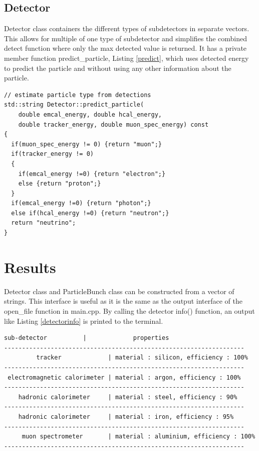 \documentclass[11pt]{article} %
\begin{document}
\subsection{Detector}
Detector class containers the different types of subdetectors in separate vectors. This allows for multiple of one type of subdetector and simplifies the combined detect function where only the max detected value is returned. It has a private member function predict\_particle, Listing \ref{predict}, which uses detected energy to predict the particle and without using any other information about the particle. 

\begin{lstlisting}[firstnumber=117, caption={Code snippet from Detector.cpp showing the logic used to predict particle that passed through the detector.}, label=predict]
// estimate particle type from detections
std::string Detector::predict_particle(
	double emcal_energy, double hcal_energy,
    double tracker_energy, double muon_spec_energy) const
{
  if(muon_spec_energy != 0) {return "muon";}
  if(tracker_energy != 0)
  {
    if(emcal_energy !=0) {return "electron";}
    else {return "proton";}
  }
  if(emcal_energy !=0) {return "photon";}
  else if(hcal_energy !=0) {return "neutron";}
  return "neutrino";
}
\end{lstlisting} 
\section{Results}
Detector class and ParticleBunch class can be constructed from a vector of strings. This interface is useful as it is the same as the output interface of the open\_file function in main.cpp.
By calling the detector info() function, an output like Listing \ref{detectorinfo} is printed to the terminal. 

\begin{lstlisting}[caption={Expected output for Detector.info() for a detector composing of 1 track, 1 electromagnetic calorimeter, 2 hadronic calorimeter and a muon spectrometer.}, label=detectorinfo]
       sub-detector          |             properties              
-------------------------------------------------------------------
         tracker             | material : silicon, efficiency : 100%
-------------------------------------------------------------------
 electromagnetic calorimeter | material : argon, efficiency : 100%
-------------------------------------------------------------------
    hadronic calorimeter     | material : steel, efficiency : 90%
-------------------------------------------------------------------
    hadronic calorimeter     | material : iron, efficiency : 95%
-------------------------------------------------------------------
     muon spectrometer       | material : aluminium, efficiency : 100%
-------------------------------------------------------------------
\end{lstlisting}
\end{document}
